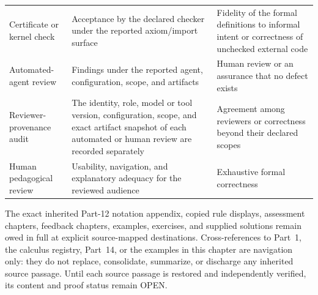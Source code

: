 \begin{landscape}
\begin{longtable}{@{}p{1.40in}p{2.35in}p{3.35in}@{}}
Certificate or kernel check & Acceptance by the declared checker under the
reported axiom/import surface & Fidelity of the formal definitions to informal
intent or correctness of unchecked external code \\ \addlinespace
Automated-agent review & Findings under the reported agent, configuration,
scope, and artifacts & Human review or an assurance that no defect exists \\
\addlinespace
Reviewer-provenance audit & The identity, role, model or tool version,
configuration, scope, and exact artifact snapshot of each automated or human
review are recorded separately & Agreement among reviewers or correctness
beyond their declared scopes \\ \addlinespace
Human pedagogical review & Usability, navigation, and explanatory adequacy for
the reviewed audience & Exhaustive formal correctness \\ \bottomrule
\end{longtable}
\endgroup
\end{landscape}

The exact inherited Part-12 notation appendix, copied rule displays,
assessment chapters, feedback chapters, examples, exercises, and supplied
solutions remain owed in full at explicit source-mapped destinations.
Cross-references to Part~1, the calculus registry, Part~14, or the examples in
this chapter are navigation only: they do not replace, consolidate, summarize,
or discharge any inherited source passage.  Until each source passage is
restored and independently verified, its content and proof status remain
OPEN.
